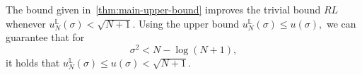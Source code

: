 \documentclass{article}
\begin{document}
The bound given in~\cref{thm:main-upper-bound} improves the trivial bound $RL$ whenever $u_N^{\mathbb L}(\sigma)<\sqrt{N+1}$. Using the upper bound $u_N^{\mathbb L}(\sigma)\le u(\sigma),$ we can guarantee that for
\[
\sigma^2<N-\log(N+1),
\]
it holds that $u_N^{\mathbb L}(\sigma)\le u(\sigma)<\sqrt{N+1}$. %







\end{document}
